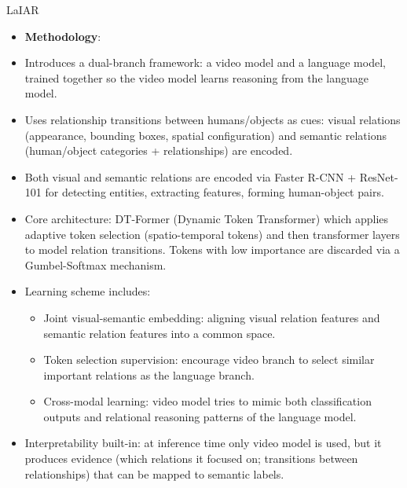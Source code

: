 \documentclass{beamer}
\begin{document}
\begin{frame}{LaIAR}
    \begin{itemize}
        \item \textbf{Methodology}:
        \item Introduces a dual-branch framework: a video model and a language model, trained together so the video model learns reasoning from the language model.
        \item Uses relationship transitions between humans/objects as cues: visual relations (appearance, bounding boxes, spatial configuration) and semantic relations (human/object categories + relationships) are encoded.
        \item Both visual and semantic relations are encoded via Faster R-CNN + ResNet-101 for detecting entities, extracting features, forming human-object pairs.
        \item Core architecture: DT-Former (Dynamic Token Transformer) which applies adaptive token selection (spatio-temporal tokens) and then transformer layers to model relation transitions. Tokens with low importance are discarded via a Gumbel-Softmax mechanism.
        \item Learning scheme includes:
              \begin{itemize}
                  \item Joint visual-semantic embedding: aligning visual relation features and semantic relation features into a common space.
                  \item Token selection supervision: encourage video branch to select similar important relations as the language branch.
                  \item Cross-modal learning: video model tries to mimic both classification outputs and relational reasoning patterns of the language model.
              \end{itemize}
        \item Interpretability built-in: at inference time only video model is used, but it produces evidence (which relations it focused on; transitions between relationships) that can be mapped to semantic labels.
    \end{itemize}
\end{frame}
\end{document}

